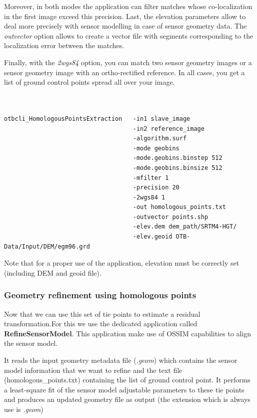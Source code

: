 Moreover, in both modes the application can filter matches whose co-localization in
the first image exceed this precision. Last, the elevation parameters allow to deal
more precisely with sensor modelling in case of sensor geometry data. The
\textit{outvector} option allows to create a vector file with segments
corresponding to the localization error between the matches.

Finally, with the \textit{2wgs84} option, you can match two sensor geometry images or a
sensor geometry image with an ortho-rectified reference. In all cases, you get
a list of ground control points spread all over your image.

\begin{verbatim}


otbcli_HomologousPointsExtraction   -in1 slave_image
                                    -in2 reference_image
                                    -algorithm.surf
                                    -mode geobins
                                    -mode.geobins.binstep 512
                                    -mode.geobins.binsize 512
                                    -mfilter 1
                                    -precision 20
                                    -2wgs84 1
                                    -out homologous_points.txt
                                    -outvector points.shp
                                    -elev.dem dem_path/SRTM4-HGT/
                                    -elev.geoid OTB-Data/Input/DEM/egm96.grd

\end{verbatim}

Note that for a proper use of the application, elevation must be correctly set
(including DEM and geoid file).

\subsubsection{Geometry refinement using homologous points}

Now that we can use this set of tie points to estimate a residual
transformation.For this we use the dedicated application called
\textbf{RefineSensorModel}. This application make use of OSSIM capabilities to
align the sensor model.

It reads the input geometry metadata file (\textit{.geom}) which contains the
sensor model information that we want to refine and the text file
(homologous\_points.txt) containing the list of ground control point. It
performs a least-square fit of the sensor model adjustable parameters to these
tie points and produces an updated geometry file as output (the extension which
is always use is \textit{.geom})

